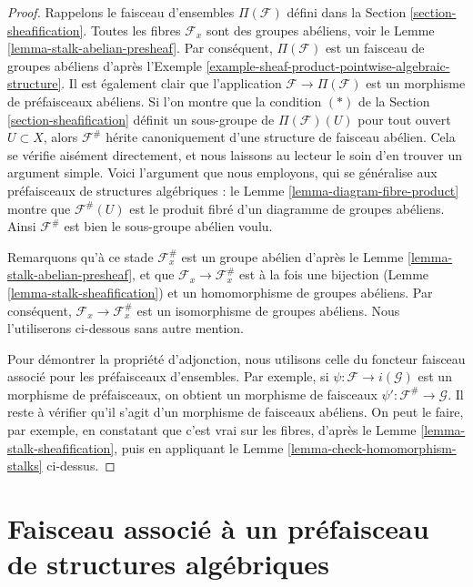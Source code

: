 \begin{proof}
Rappelons le faisceau d'ensembles $\Pi(\mathcal{F})$ défini dans la
Section \ref{section-sheafification}. Toutes les fibres
$\mathcal{F}_x$ sont des groupes abéliens, voir le
Lemme \ref{lemma-stalk-abelian-presheaf}.
Par conséquent, $\Pi(\mathcal{F})$ est un faisceau de groupes abéliens d'après
l'Exemple \ref{example-sheaf-product-pointwise-algebraic-structure}.
Il est également clair que l'application $\mathcal{F} \to \Pi(\mathcal{F})$
est un morphisme de préfaisceaux abéliens. Si l'on montre que
la condition $(*)$ de la Section \ref{section-sheafification} définit un sous-groupe
de $\Pi(\mathcal{F})(U)$ pour tout ouvert $U \subset X$,
alors $\mathcal{F}^\#$ hérite canoniquement d'une structure de faisceau abélien.
Cela se vérifie aisément directement, et nous laissons au
lecteur le soin d'en trouver un argument simple. Voici l'argument que nous employons,
qui se généralise aux préfaisceaux de structures algébriques :
le Lemme \ref{lemma-diagram-fibre-product} montre que
$\mathcal{F}^\#(U)$ est le produit fibré d'un diagramme
de groupes abéliens. Ainsi $\mathcal{F}^\#$ est bien le
sous-groupe abélien voulu.

\medskip\noindent
Remarquons qu'à ce stade $\mathcal{F}^\#_x$ est un groupe
abélien d'après le Lemme \ref{lemma-stalk-abelian-presheaf},
et que $\mathcal{F}_x \to \mathcal{F}^\#_x$ est à la fois une
bijection (Lemme \ref{lemma-stalk-sheafification})
et un homomorphisme de groupes abéliens. Par conséquent,
$\mathcal{F}_x \to \mathcal{F}^\#_x$ est un isomorphisme
de groupes abéliens. Nous l'utiliserons ci-dessous sans autre mention.

\medskip\noindent
Pour démontrer la propriété d'adjonction, nous utilisons celle du
foncteur faisceau associé pour les préfaisceaux d'ensembles. Par exemple,
si $\psi : \mathcal{F} \to i(\mathcal{G})$ est un morphisme de préfaisceaux,
on obtient un morphisme de faisceaux
$\psi' : \mathcal{F}^\# \to \mathcal{G}$. Il reste à vérifier
qu'il s'agit d'un morphisme de faisceaux abéliens. On peut le faire,
par exemple, en constatant que c'est vrai sur les fibres,
d'après le Lemme \ref{lemma-stalk-sheafification}, puis en appliquant le
Lemme \ref{lemma-check-homomorphism-stalks} ci-dessus.
\end{proof}



\section{Faisceau associé à un préfaisceau de structures algébriques}
\label{section-sheafification-presheaves-structures}


